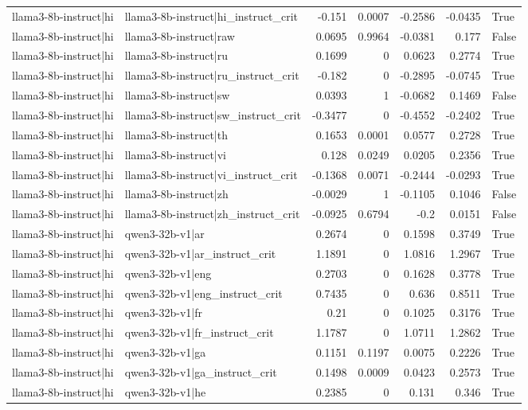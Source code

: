 \begin{table}
\begin{tabular}{l l r r r r l}
llama3-8b-instruct|hi & llama3-8b-instruct|hi_instruct_crit & -0.151 & 0.0007 & -0.2586 & -0.0435 & True \\
llama3-8b-instruct|hi & llama3-8b-instruct|raw & 0.0695 & 0.9964 & -0.0381 & 0.177 & False \\
llama3-8b-instruct|hi & llama3-8b-instruct|ru & 0.1699 & 0 & 0.0623 & 0.2774 & True \\
llama3-8b-instruct|hi & llama3-8b-instruct|ru_instruct_crit & -0.182 & 0 & -0.2895 & -0.0745 & True \\
llama3-8b-instruct|hi & llama3-8b-instruct|sw & 0.0393 & 1 & -0.0682 & 0.1469 & False \\
llama3-8b-instruct|hi & llama3-8b-instruct|sw_instruct_crit & -0.3477 & 0 & -0.4552 & -0.2402 & True \\
llama3-8b-instruct|hi & llama3-8b-instruct|th & 0.1653 & 0.0001 & 0.0577 & 0.2728 & True \\
llama3-8b-instruct|hi & llama3-8b-instruct|vi & 0.128 & 0.0249 & 0.0205 & 0.2356 & True \\
llama3-8b-instruct|hi & llama3-8b-instruct|vi_instruct_crit & -0.1368 & 0.0071 & -0.2444 & -0.0293 & True \\
llama3-8b-instruct|hi & llama3-8b-instruct|zh & -0.0029 & 1 & -0.1105 & 0.1046 & False \\
llama3-8b-instruct|hi & llama3-8b-instruct|zh_instruct_crit & -0.0925 & 0.6794 & -0.2 & 0.0151 & False \\
llama3-8b-instruct|hi & qwen3-32b-v1|ar & 0.2674 & 0 & 0.1598 & 0.3749 & True \\
llama3-8b-instruct|hi & qwen3-32b-v1|ar_instruct_crit & 1.1891 & 0 & 1.0816 & 1.2967 & True \\
llama3-8b-instruct|hi & qwen3-32b-v1|eng & 0.2703 & 0 & 0.1628 & 0.3778 & True \\
llama3-8b-instruct|hi & qwen3-32b-v1|eng_instruct_crit & 0.7435 & 0 & 0.636 & 0.8511 & True \\
llama3-8b-instruct|hi & qwen3-32b-v1|fr & 0.21 & 0 & 0.1025 & 0.3176 & True \\
llama3-8b-instruct|hi & qwen3-32b-v1|fr_instruct_crit & 1.1787 & 0 & 1.0711 & 1.2862 & True \\
llama3-8b-instruct|hi & qwen3-32b-v1|ga & 0.1151 & 0.1197 & 0.0075 & 0.2226 & True \\
llama3-8b-instruct|hi & qwen3-32b-v1|ga_instruct_crit & 0.1498 & 0.0009 & 0.0423 & 0.2573 & True \\
llama3-8b-instruct|hi & qwen3-32b-v1|he & 0.2385 & 0 & 0.131 & 0.346 & True \\

\end{tabular}
\end{table}
